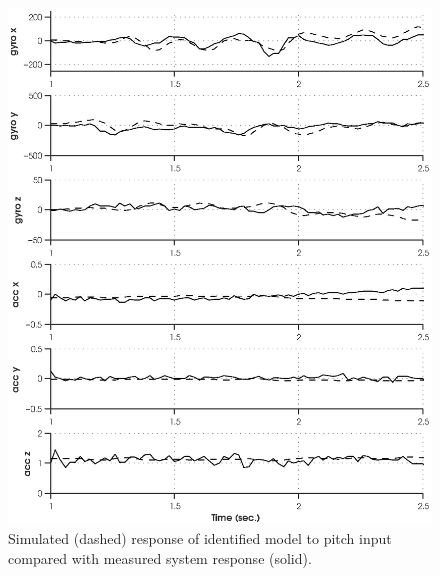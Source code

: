 \newpage
\begin{figure}[htb!]
	\centering
	\includegraphics{../fig/sim_1760_pitch.eps}
	\caption{Simulated (dashed) response of identified model to pitch input compared with measured system response (solid).}
	\label{sim_1760_pitch}
\end{figure}\clearpage

